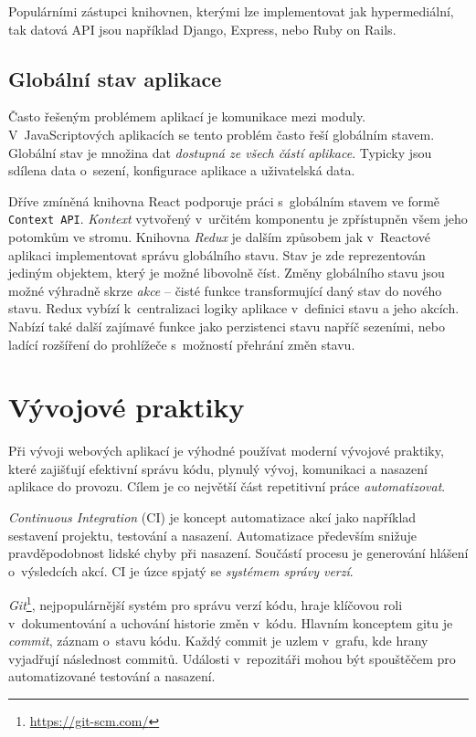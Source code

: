 Populárními zástupci knihovnen, kterými lze implementovat jak hypermediální, tak datová API jsou například Django, Express, nebo Ruby on Rails.



\subsection{Globální stav aplikace}

Často řešeným problémem aplikací je komunikace mezi moduly.
V~JavaScriptových aplikacích se tento problém často řeší globálním stavem.
Globální stav je množina dat \emph{dostupná ze všech částí aplikace}.
Typicky jsou sdílena data o~sezení, konfigurace aplikace a uživatelská data. 

Dříve zmíněná knihovna React podporuje práci s~globálním stavem ve formě \texttt{Context API}.
\emph{Kontext} vytvořený v~určitém komponentu je zpřístupněn všem jeho potomkům ve stromu.
Knihovna \emph{Redux} je dalším způsobem jak v~Reactové aplikaci implementovat správu globálního stavu. 
Stav je zde reprezentován jediným objektem, který je možné libovolně číst.
Změny globálního stavu jsou možné výhradně skrze \emph{akce} -- čisté funkce transformující daný stav do nového stavu.
Redux vybízí k~centralizaci logiky aplikace v~definici stavu a jeho akcích.
Nabízí také další zajímavé funkce jako perzistenci stavu napříč sezeními, nebo ladící rozšíření do prohlížeče s~možností přehrání změn stavu.

\section{Vývojové praktiky}

Při vývoji webových aplikací je výhodné používat moderní vývojové praktiky, které zajišťují efektivní správu kódu, plynulý vývoj, komunikaci a nasazení aplikace do provozu.
Cílem je co největší část repetitivní práce \emph{automatizovat}.

\emph{Continuous Integration} (CI) je koncept automatizace akcí jako například sestavení projektu, testování a nasazení.
Automatizace především snižuje pravděpodobnost lidské chyby při nasazení.
Součástí procesu je generování hlášení o~výsledcích akcí.
CI je úzce spjatý se \emph{systémem správy verzí}.

\emph{Git}\footnote{\url{https://git-scm.com/}}, nejpopulárnější systém pro správu verzí kódu, hraje klíčovou roli v~dokumentování a uchování historie změn v~kódu.
Hlavním konceptem gitu je \emph{commit}, záznam o~stavu kódu.
Každý commit je uzlem v~grafu, kde hrany vyjadřují následnost commitů.
Události v~repozitáři mohou být spouštěčem pro automatizované testování a nasazení. \cite{Dhakad2023AdoptingCI}

